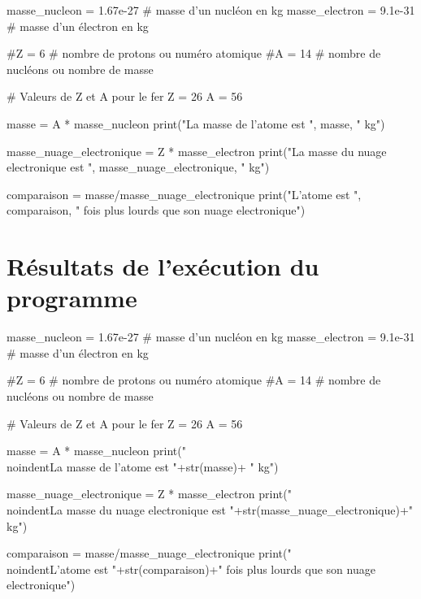 \documentclass[12pt,a4paper]{article}
\begin{document}
\begin{pyverbatim}
masse_nucleon = 1.67e-27    # masse d'un nucléon en kg
masse_electron = 9.1e-31    # masse d'un électron en kg

#Z = 6                       # nombre de protons ou numéro atomique
#A = 14                      # nombre de nucléons ou nombre de masse

# Valeurs de Z et A pour le fer
Z = 26
A = 56

masse = A * masse_nucleon
print("La masse de l'atome est ", masse, " kg")

masse_nuage_electronique = Z * masse_electron
print("La masse du nuage electronique est ", masse_nuage_electronique, " kg")

comparaison = masse/masse_nuage_electronique
print("L'atome est ", comparaison, " fois plus lourds que son nuage electronique")
\end{pyverbatim}

\section*{Résultats de l'exécution du programme}

\begin{ttfamily}
\begin{pycode}
masse_nucleon = 1.67e-27    # masse d'un nucléon en kg
masse_electron = 9.1e-31    # masse d'un électron en kg

#Z = 6                       # nombre de protons ou numéro atomique
#A = 14                      # nombre de nucléons ou nombre de masse

# Valeurs de Z et A pour le fer
Z = 26
A = 56

masse = A * masse_nucleon
print("\\noindent{}La masse de l'atome est "+str(masse)+ " kg\n")

masse_nuage_electronique = Z * masse_electron
print("\\noindent{}La masse du nuage electronique est "+str(masse_nuage_electronique)+" kg\n")

comparaison = masse/masse_nuage_electronique
print("\\noindent{}L'atome est "+str(comparaison)+" fois plus lourds que son nuage electronique")
\end{pycode}
\end{ttfamily}
\end{document}
